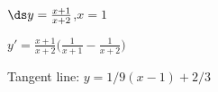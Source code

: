{$\ds y=\frac{x+1}{x+2}$,\quad $x=1$
}
{$y'= \frac{x+1}{x+2}\big(\frac1{x+1}-\frac1{x+2}\big)$

Tangent line: $y = 1/9(x-1)+2/3$
}
